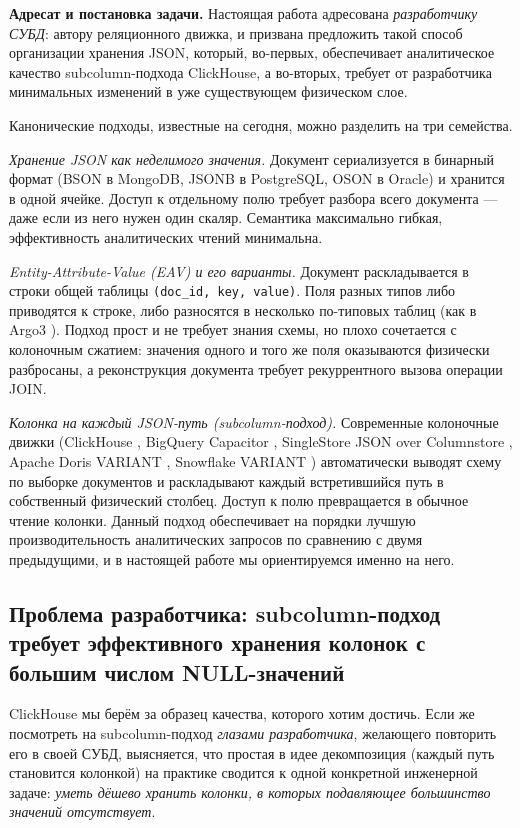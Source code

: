 \documentclass[conference,a4paper,10pt]{IEEEtran}
\begin{document}
\textbf{Адресат и постановка задачи.} Настоящая работа адресована
\emph{разработчику СУБД}: автору реляционного движка, и призвана предложить
такой способ организации хранения JSON, который, во-первых,
обеспечивает аналитическое качество subcolumn-подхода ClickHouse, а
во-вторых, требует от разработчика минимальных изменений в уже
существующем физическом слое.

Канонические подходы, известные на сегодня, можно разделить на три
семейства.

\textit{Хранение JSON как неделимого значения.}
Документ сериализуется в бинарный формат (BSON в MongoDB, JSONB в
PostgreSQL, OSON в Oracle) и хранится в одной ячейке. Доступ к
отдельному полю требует разбора всего документа --- даже если из него
нужен один скаляр. Семантика максимально гибкая, эффективность
аналитических чтений минимальна.

\medskip
\textit{Entity-Attribute-Value (EAV) и его варианты.}
Документ раскладывается в строки общей таблицы
\texttt{(doc\_id, key, value)}. Поля разных типов либо приводятся к
строке, либо разносятся в несколько по-типовых таблиц (как в Argo3
\cite{argo}). Подход прост и не требует знания схемы, но плохо
сочетается с колоночным сжатием: значения одного и того же поля
оказываются физически разбросаны, а реконструкция документа требует
рекуррентного вызова операции JOIN.

\medskip
\textit{Колонка на каждый JSON-путь (subcolumn-подход).}
Современные колоночные движки (ClickHouse \cite{clickhouseJson},
BigQuery Capacitor \cite{bigqueryCapacitor}, SingleStore JSON over
Columnstore \cite{singlestoreJson}, Apache Doris VARIANT
\cite{dorisVariant}, Snowflake VARIANT \cite{snowflakeSigmod})
автоматически выводят схему по выборке документов и раскладывают
каждый встретившийся путь в собственный физический столбец. Доступ
к полю превращается в обычное чтение колонки. Данный подход
обеспечивает на порядки лучшую производительность аналитических
запросов по сравнению с двумя предыдущими, и в настоящей работе мы
ориентируемся именно на него.

\subsection{Проблема разработчика: subcolumn-подход требует
эффективного хранения колонок с большим числом NULL-значений}
\label{sec:problem}

ClickHouse мы берём за образец качества, которого хотим достичь.
Если же посмотреть на subcolumn-подход \emph{глазами разработчика},
желающего повторить его в своей СУБД, выясняется, что простая в
идее декомпозиция (каждый путь становится колонкой) на практике
сводится к одной конкретной инженерной задаче: \emph{уметь дёшево
хранить колонки, в которых подавляющее большинство значений
отсутствует}.
\end{document}
